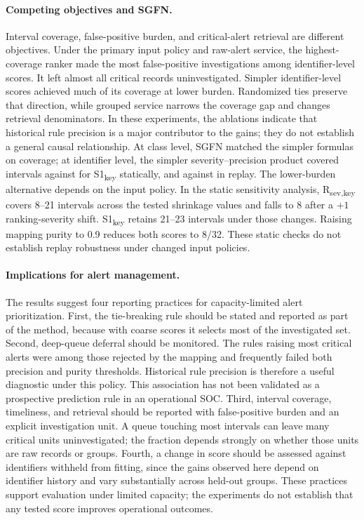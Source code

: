 \documentclass[pdflatex,sn-basic,Numbered]{sn-jnl}
\newcommand{\key}{\textsubscript{key}}
\newcommand{\Rsev}{R\textsubscript{sev,key}}
\begin{document}
\paragraph{Competing objectives and SGFN.} Interval coverage, false-positive burden, and critical-alert retrieval are different objectives. Under the primary input policy and raw-alert service, the highest-coverage ranker made the most false-positive investigations among identifier-level scores. It left almost all critical records uninvestigated. Simpler identifier-level scores achieved much of its coverage at lower burden. Randomized ties preserve that direction, while grouped service narrows the coverage gap and changes retrieval denominators. In these experiments, the ablations indicate that historical rule precision is a major contributor to the gains; they do not establish a general causal relationship. At class level, SGFN matched the simpler formulas on coverage; at identifier level, the simpler severity--precision product covered \StaticRSevKeyCovered{} intervals against \StaticSOneKeyCovered{} for S1\key{} statically, and \ReplayRSevKeyCovered{} against \ReplaySOneKeyCovered{} in replay. The lower-burden alternative depends on the input policy. In the static sensitivity analysis, \Rsev{} covers 8--21 intervals across the tested shrinkage values and falls to 8 after a $+1$ ranking-severity shift. S1\key{} retains 21--23 intervals under those changes. Raising mapping purity to 0.9 reduces both scores to 8/32. These static checks do not establish replay robustness under changed input policies.

\paragraph{Implications for alert management.} The results suggest four reporting practices for capacity-limited alert prioritization. First, the tie-breaking rule should be stated and reported as part of the method, because with coarse scores it selects most of the investigated set. Second, deep-queue deferral should be monitored. The rules raising most critical alerts were among those rejected by the mapping and frequently failed both precision and purity thresholds. Historical rule precision is therefore a useful diagnostic under this policy. This association has not been validated as a prospective prediction rule in an operational SOC. Third, interval coverage, timeliness, and retrieval should be reported with false-positive burden and an explicit investigation unit. A queue touching most intervals can leave many critical units uninvestigated; the fraction depends strongly on whether those units are raw records or groups. Fourth, a change in score should be assessed against identifiers withheld from fitting, since the gains observed here depend on identifier history and vary substantially across held-out groups. These practices support evaluation under limited capacity; the experiments do not establish that any tested score improves operational outcomes.
\end{document}
